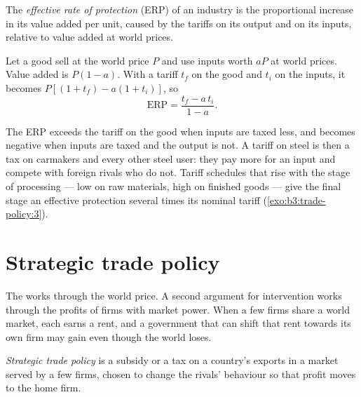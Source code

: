 \begin{definition}\label{def:b3:trade-policy:erp}
The \emph{effective rate of protection} (ERP) of an industry is the proportional
increase in its value added per unit, caused by the tariffs on its output and on
its inputs, relative to value added at world prices.
\end{definition}

Let a good sell at the world price $P$ and use inputs worth $aP$ at world prices.
Value added is $P(1 - a)$. With a tariff $t_f$ on the good and $t_i$ on the inputs, it
becomes $P[(1 + t_f) - a(1 + t_i)]$, so
\begin{equation}\label{eq:b3:tp:erp}
  \mathrm{ERP} = \frac{t_f - a\,t_i}{1 - a} .
\end{equation}

\begin{measure}
The ERP exceeds the tariff on the good when inputs are taxed less, and becomes
negative when inputs are taxed and the output is not. A tariff on steel is then a
tax on carmakers and every other steel user: they pay more for an input and
compete with foreign rivals who do not. Tariff schedules that rise with the stage
of processing --- low on raw materials, high on finished goods --- give the final
stage an effective protection several times its nominal tariff
(\cref{exo:b3:trade-policy:3}).
\end{measure}

\section{Strategic trade policy}\label{sec:b3:trade-policy:strategic}

The  works through the world price. A second argument for
intervention works through the profits of firms with market power. When a few
firms share a world market, each earns a rent, and a government that can shift
that rent towards its own firm may gain even though the world loses.

\begin{definition}\label{def:b3:trade-policy:strategic}
\emph{Strategic trade policy} is a subsidy or a tax on a country's exports in a
market served by a few firms, chosen to change the rivals' behaviour so that
profit moves to the home firm.
\end{definition}

